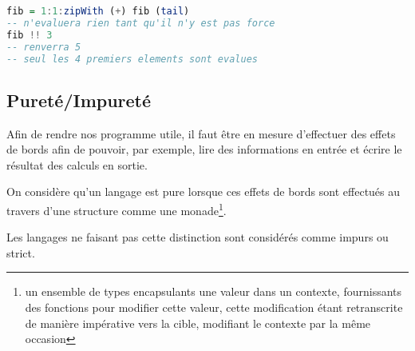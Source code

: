 \documentclass{article}
\begin{document}
\begin{lstlisting}[language=haskell]
fib = 1:1:zipWith (+) fib (tail)
-- n'evaluera rien tant qu'il n'y est pas force
fib !! 3
-- renverra 5
-- seul les 4 premiers elements sont evalues
\end{lstlisting}

\subsection{Pureté/Impureté}
Afin de rendre nos programme utile, il faut être en mesure d'effectuer
des effets de bords afin de pouvoir, par exemple, lire des informations en entrée
et écrire le résultat des calculs en sortie.

On considère qu'un langage est pure lorsque ces effets de bords sont effectués au
travers d'une structure comme une monade\footnote{un ensemble de types
encapsulants une valeur dans un contexte, fournissants des fonctions pour
modifier cette valeur, cette modification étant retranscrite de manière
impérative vers la cible, modifiant le contexte par la même occasion}.

Les langages ne faisant pas cette distinction sont considérés comme impurs ou strict.
\end{document}
